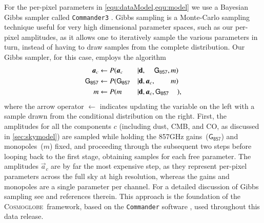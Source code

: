 \documentclass{aa}
\def\cosmoglobe{\textsc{Cosmoglobe}}
\def\,{\thinspace}
\begin{document}
For the per-pixel parameters in \cref{equ:dataModel,equ:model} we use a Bayesian Gibbs sampler called \texttt{Commander3} \citep{bp03}. Gibbs sampling \citep{geman:1984} is a Monte-Carlo sampling technique useful for very high dimensional parameter spaces, such as our per-pixel amplitudes, as it allows one to iteratively sample the various parameters in turn, instead of having to draw samples from the complete distribution. 
Our Gibbs sampler, for this case, employs the algorithm 
\begin{alignat}{2}
  \label{eq:gibbs1}
  \vec{a}_c &\leftarrow P(\vec{a}_c &&|{\bf d}, \phantom{\vec{a}_c ,} \mathsf{G_{857}},m)\\
  \label{eq:gibbs2}
\mathsf{G_{857}} &\leftarrow P(\mathsf{G_{857}} &&|{\bf d}, \vec{a}_c,\phantom{\mathsf{G_{857}},}m)\\ 
m &\leftarrow P(m &&|{\bf d}, \vec{a}_c,\mathsf{G_{857}}\phantom{,m}) ,
\label{eq:gibbs3}
\end{alignat}
where the arrow operator $\leftarrow$ indicates updating the variable on the left with a sample drawn from the conditional distribution on the right. First, the amplitudes for all the components $c$ (including dust, CMB, and CO, as discussed in \cref{sec:skymodel}) are sampled while holding the 857\,GHz gains~($\mathsf{G_{857}}$) and monopoles~($m$) fixed, and proceeding through the subsequent two steps before looping back to the first stage, obtaining samples for each free parameter. The amplitudes $\vec{a}_c$ are by far the most expensive step, as they represent per-pixel parameters across the full sky at high resolution, whereas the gains and monopoles are a single parameter per channel. For a detailed discussion of Gibbs sampling see \cite{bp01,eriksen2008} and references therein. This approach is the foundation of the \cosmoglobe\ framework, based on the \texttt{Commander} software \citep{eriksen:2004,seljebotn:2019,bp03}, used throughout this data release. 
\end{document}
